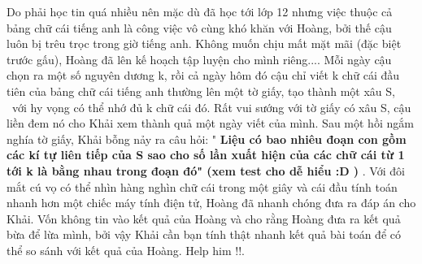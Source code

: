 Do phải học tin quá nhiều nên mặc dù đã học tới lớp 12 nhưng việc thuộc cả bảng chữ cái tiếng anh là công việc vô cùng khó khăn với Hoàng, bởi thế cậu luôn bị trêu trọc trong giờ tiếng anh. Không muốn chịu mất mặt mãi (đặc biệt trước gấu), Hoàng đã lên kế hoạch tập luyện cho mình riêng.... Mỗi ngày cậu chọn ra một số nguyên dương k, rồi cả ngày hôm đó cậu chỉ viết k chữ cái đầu tiên của bảng chữ cái tiếng anh thường lên một tờ giấy, tạo thành một xâu S,  với hy vọng có thể nhớ đủ k chữ cái đó. Rất vui sướng với tờ giấy có xâu S, cậu liền đem nó cho Khải xem thành quả một ngày viết của mình. Sau một hồi ngắm nghía tờ giấy, Khải bỗng nảy ra câu hỏi: "   \textbf{    Liệu có bao nhiêu đoạn con gồm các kí tự liên tiếp của S sao cho số lần xuất hiện của các chữ cái từ 1 tới k là bằng nhau trong đoạn đó" (xem test cho dễ hiểu :D )   }   . Với đôi mắt cú vọ có thể nhìn hàng nghìn chữ cái trong một giây và cái đầu tính toán nhanh hơn một chiếc máy tính điện tử, Hoàng đã nhanh chóng đưa ra đáp án cho Khải. Vốn không tin vào kết quả của Hoàng và cho rằng Hoàng đưa ra kết quả bừa để lừa mình, bởi vậy Khải cần bạn tính thật nhanh kết quả bài toán để có thể so sánh với kết quả của Hoàng. Help him !!.  

\